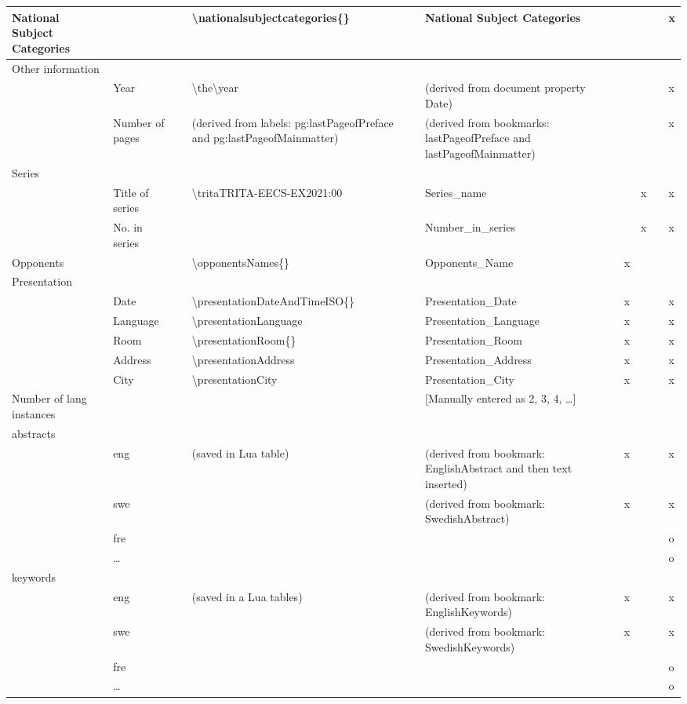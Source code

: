 \documentclass[12pt, twoside]{article}
\begin{document}
\begin{landscape}
{\begin{longtable}{L{2cm}|L{4cm}|l|L{4cm}|L{4cm}|l l l l|}
  \hline
National Subject Categories &  &  & \textbackslash nationalsubjectcategories\{\} & National Subject Categories &  &  &  & x \\
 \hline
Other information & \\
 & Year &  & \textbackslash the\textbackslash year & (derived from document property Date) &  &  &  & x \\
 & Number of pages &  & (derived from labels: pg:lastPageofPreface and pg:lastPageofMainmatter) & (derived from bookmarks: lastPageofPreface and lastPageofMainmatter) &  &  &  & x \\
Series & \\
 & Title of series &  & \textbackslash trita{TRITA-EECS-EX}{2021:00} & Series\_name &  & x &  & x \\
 & No. in series &  &  & Number\_in\_series &  & x &  & x \\
Opponents &  &  & \textbackslash opponentsNames\{\} & Opponents\_Name & x &  &  & \\
Presentation & \\
 & Date &  & \textbackslash presentationDateAndTimeISO\{\} & Presentation\_Date & x &  &  & x \\
 & Language &  & \textbackslash presentationLanguage{ } & Presentation\_Language & x &  &  & x \\
 & Room &  & \textbackslash presentationRoom\{\} & Presentation\_Room & x &  &  & x \\
 & Address &  & \textbackslash presentationAddress{ } & Presentation\_Address & x &  &  & x \\
 & City &  & \textbackslash presentationCity{ } & Presentation\_City & x &  &  & x \\
\hline
Number of lang instances &  &  &  & [Manually entered as 2, 3, 4, …] &  &  &  & \\
abstracts & \\
 & eng &  & (saved in Lua table) & (derived from bookmark: EnglishAbstract and then text inserted) & x &  &  & x \\
 & swe &  &  & (derived from bookmark: SwedishAbstract) & x &  &  & x \\
 & fre &  & &  & o\\
 & … &  & &  & o\\
keywords & \\
 & eng &  & (saved in a Lua tables) & (derived from bookmark: EnglishKeywords) & x &  &  & x \\
 & swe &  &  & (derived from bookmark: SwedishKeywords) & x &  &  & x \\
 & fre &  & &  & o \\
 & … &  & &  & o\\
\hline
\end{longtable}
}
\end{landscape}
\end{document}
